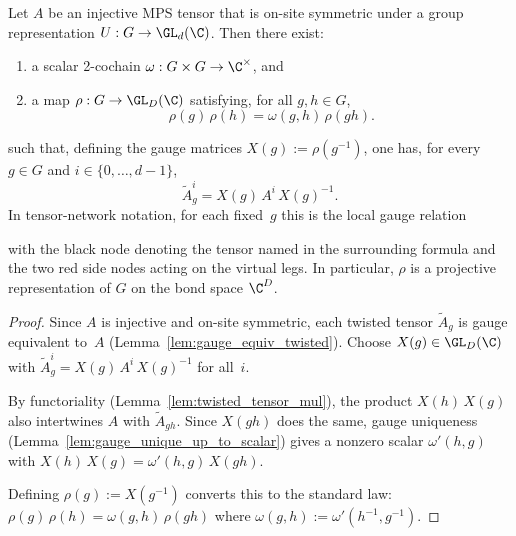 \begin{theorem}%
    \label{thm:virtual_rep_injective}
    \leanok
    Let $A$ be an injective MPS tensor that is on-site symmetric
    under a group representation $U : G \to \GL_{d}(\C)$.
    Then there exist:
    \begin{enumerate}
        \item a scalar 2-cochain
              $\omega : G \times G \to \C^{\times}$, and
        \item a map $\rho : G \to \GL_{D}(\C)$ satisfying, for all $g,h \in G$,
              \[
                  \rho(g)\, \rho(h) = \omega(g,h)\, \rho(gh).
              \]
    \end{enumerate}
    such that, defining the gauge matrices $X(g) := \rho(g^{-1})$,
    one has, for every $g \in G$ and $i \in \{0,\ldots,d{-}1\}$,
    \[
        \widetilde{A}_g^i =  X(g)\, A^i\, X(g)^{-1}.
    \]
    In tensor-network notation, for each fixed~$g$ this is the local gauge
    relation
    \begin{center}
    \end{center}
    with the black node denoting the tensor named in the surrounding
    formula and the two red side nodes acting on the virtual legs.
    In particular, $\rho$ is a projective representation of $G$ on the
    bond space $\C^D$.
\end{theorem}

\begin{proof}
    \leanok
    Since $A$ is injective and on-site symmetric, each twisted tensor
    $\widetilde{A}_g$ is gauge equivalent to~$A$
    (Lemma~\ref{lem:gauge_equiv_twisted}).
    Choose $X(g) \in \GL_{D}(\C)$ with
    $\widetilde{A}_g^i = X(g)\, A^i\, X(g)^{-1}$ for all~$i$.

    By functoriality (Lemma~\ref{lem:twisted_tensor_mul}), the product
    $X(h)\, X(g)$ also intertwines $A$ with $\widetilde{A}_{gh}$.
    Since $X(gh)$ does the same, gauge uniqueness
    (Lemma~\ref{lem:gauge_unique_up_to_scalar}) gives a nonzero scalar
    $\omega'(h,g)$ with $X(h)\, X(g) = \omega'(h,g)\, X(gh)$.

    Defining $\rho(g) := X(g^{-1})$ converts this to the standard law:
    $\rho(g)\, \rho(h) = \omega(g,h)\, \rho(gh)$
    where $\omega(g,h) := \omega'(h^{-1}, g^{-1})$.
\end{proof}

